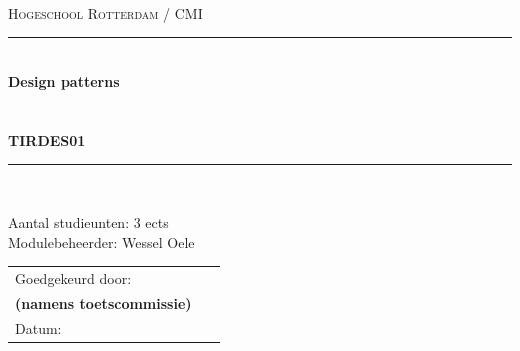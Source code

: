 \documentclass[titlepage,a4paper, 11pt]{article}
\newcommand{\mcode}{TIRDES01}  %
\newcommand{\mname}{Design patterns} %
\newcommand{\HRule}{\rule{\linewidth}{1pt}} %
\begin{document}
\sffamily
\begin{titlepage}

\thispagestyle{fancy}
\ \\
\ \\
\ \\
\begin{center}

  \textsc{\LARGE Hogeschool Rotterdam / CMI}\\[1.5cm]

  \HRule \\[0.4cm]
  { \Huge \bfseries \mname}\\[0.4cm]
  \ \\
  \ \\
  { \large \bfseries \mcode}\\[0.4cm]

  \HRule \\[1.5cm]

  \vfill
  \begin{minipage}{0.5\textwidth}
    \begin{flushleft}
      Aantal studieunten: 3 ects\\
      Modulebeheerder: Wessel Oele
    \end{flushleft}
\end{minipage}
\begin{minipage}{0.4\textwidth}
  \begin{flushright}
		\begin{tabular}{ | l l |}
		  \hline
		  Goedgekeurd door: &\ \\
		  \textbf{(namens toetscommissie)} & \ \\
		  Datum: & \ \\
		  \hline
		\end{tabular}
  \end{flushright}
\end{minipage}
\end{center}
\end{titlepage}
\rfoot{\thepage} %
\tableofcontents %
\newpage
\end{document}
